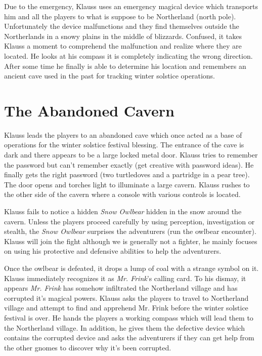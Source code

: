 \documentclass{article}
\begin{document}
\begin{multicols*}{2}
	Due to the emergency, Klauss uses an emergency magical device which transports him and all the players to what is suppose to be Northerland (north pole). Unfortunately the device malfunctions and they find themselves outside the Northerlands in a snowy plains in the middle of blizzards. Confused, it takes Klauss a moment to comprehend the malfunction and realize where they are located. He looks at his compass it is completely indicating the wrong direction. After some time he finally is able to determine his location and remembers an ancient cave used in the past for tracking winter solstice operations. 
	
	\section{The Abandoned Cavern}
	
	Klauss leads the players to an abandoned cave which once acted as a base of operations for the winter solstice festival blessing. The entrance of the cave is dark and there appears to be a large locked metal door. Klauss tries to remember the password but can't remember exactly (get creative with password ideas). He finally gets the right password (two turtledoves and a partridge in a pear tree). The door opens and torches light to illuminate a large cavern. Klauss rushes to the other side of the cavern where a console with various controls is located.
	
	Klauss fails to notice a hidden \emph{Snow Owlbear} hidden in the snow around the cavern. Unless the players proceed carefully by using perception, investigation or stealth, the \emph{Snow Owlbear} surprises the adventurers (run the owlbear encounter). Klauss will join the fight although we is generally not a fighter, he mainly focuses on using his protective and defensive abilities to help the adventurers.
	
	Once the owlbear is defeated, it drops a lump of coal with a strange symbol on it. Klauss immediately recognizes it as \emph{Mr. Frink}'s calling card. To his dismay, it appears \emph{Mr. Frink} has somehow infiltrated the Northerland village and has corrupted it's magical powers. Klauss asks the players to travel to Northerland village and attempt to find and apprehend Mr. Frink before the winter solstice festival is over. He hands the players a working compass which will lead them to the Northerland village. In addition, he gives them the defective device which contains the corrupted device and asks the adventurers if they can get help from the other gnomes to discover why it's been corrupted.
	

\end{multicols*}
\end{document}
